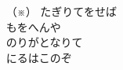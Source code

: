 \documentclass[10pt,b5j]{tarticle} %
\begin{document}
\begin{enumerate} %
    \vspace{\linespace}
    \item[（※）]
    たぎりてをせば\\
    もをへんや\\
    のりがとなりて\\
    にるはこのぞ
\end{enumerate} %
\end{document}
